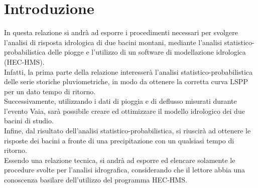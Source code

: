 \section{Introduzione}
In questa relazione si andrà ad esporre i procedimenti necessari per svolgere l'analisi di risposta idrologica di due bacini montani, mediante l'analisi statistico-probabilistica delle piogge e l'utilizzo di un software di modellazione idrologica (HEC-HMS).\\
Infatti, la prima parte della relazione interesserà l'analisi statistico-probabilistica delle serie storiche pluviometriche, in modo da ottenere la corretta curva LSPP per un dato tempo di ritorno.\\
Successivamente, utilizzando i dati di pioggia e di deflusso misurati durante l'evento Vaia, sarà possibile creare ed ottimizzare il modello idrologico dei due bacini di studio.\\
Infine, dal risultato dell'analisi statistico-probabilistica, si riuscirà ad ottenere le risposte dei bacini a fronte di una precipitazione con un qualsiasi tempo di ritorno.\\
Essendo una relazione tecnica, si andrà ad esporre ed elencare solamente le procedure svolte per l'analisi idrografica, considerando che il lettore abbia una conoscenza basilare dell'utilizzo del programma HEC-HMS.